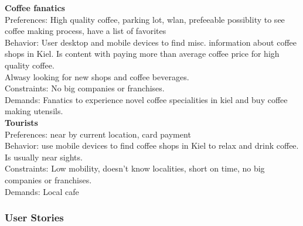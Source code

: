 \textbf{Coffee fanatics}\\
Preferences: High quality coffee, parking lot, wlan, prefeeable possiblity to see coffee making process, have a list of favorites  \\
Behavior: User desktop and mobile devices to find misc. information about coffee shops in Kiel. Is content with paying more than average coffee price for high quality coffee.\\
                 Alwasy looking for new shops and coffee beverages. \\
Constraints: No big companies or franchises. \\
Demands: Fanatics to experience novel coffee specialities in kiel and buy coffee making utensils.\\
\textbf{Tourists}\\
Preferences: near by current location, card payment \\
Behavior: use mobile devices to find coffee shops in Kiel to relax and drink coffee. Is usually near sights. \\
Constraints: Low mobility, doesn't know localities, short on time, no big companies or franchises. \\
Demands: Local cafe\\

\subsubsection{User Stories}

